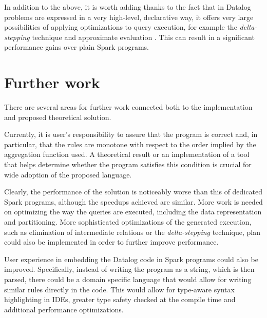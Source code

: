 In addition to the above, it is worth adding thanks to the fact that in Datalog problems are expressed in a very high-level, declarative way, it offers very large possibilities of applying optimizations to query execution, for example the \emph{delta-stepping} technique and approximate evaluation \cite{distsoc}. This can result in a significant performance gains over plain Spark programs.


\section{Further work}

There are several areas for further work connected both to the implementation and proposed theoretical solution.

Currently, it is user's responsibility to assure that the program is correct and, in particular, that the rules are monotone with respect to the order implied by the aggregation function used. A theoretical result or an implementation of a tool that helps determine whether the program satisfies this condition is crucial for wide adoption of the proposed language.

Clearly, the performance of the solution is noticeably worse than this of dedicated Spark programs, although the speedups achieved are similar. More work is needed on optimizing the way the queries are executed, including the data representation and partitioning. More sophisticated optimizations of the generated execution, such as elimination of intermediate relations or the \emph{delta-stepping} technique, plan could also be implemented in order to further improve performance.

User experience in embedding the Datalog code in Spark programs could also be improved. Specifically, instead of writing the program as a string, which is then parsed, there could be a domain specific language that would allow for writing similar rules directly in the code. This would allow for type-aware syntax highlighting in IDEs, greater type safety checked at the compile time and additional performance optimizations.



